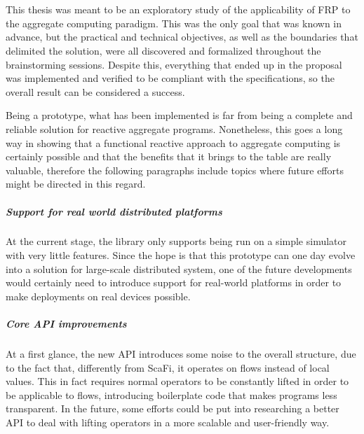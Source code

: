 \chapter{\conclusionsname}
\label{chap:conclusions}

This thesis was meant to be an exploratory study of the applicability of FRP to the aggregate computing paradigm.
%
This was the only goal that was known in advance, but the practical and technical objectives, as well as the boundaries that delimited the solution, were all discovered and formalized throughout the brainstorming sessions.
%
Despite this, everything that ended up in the proposal was implemented and verified to be compliant with the specifications, so the overall result can be considered a success.

Being a prototype, what has been implemented is far from being a complete and reliable solution for reactive aggregate programs.
%
Nonetheless, this goes a long way in showing that a functional reactive approach to aggregate computing is certainly possible and that the benefits that it brings to the table are really valuable, therefore the following paragraphs include topics where future efforts might be directed in this regard.

\paragraph{Support for real world distributed platforms}

At the current stage, the library only supports being run on a simple simulator with very little features.
%
Since the hope is that this prototype can one day evolve into a solution for large-scale distributed system, one of the future developments would certainly need to introduce support for real-world platforms in order to make deployments on real devices possible.

\paragraph{Core API improvements}

At a first glance, the new API introduces some noise to the overall structure, due to the fact that, differently from ScaFi, it operates on flows instead of local values.
%
This in fact requires normal operators to be constantly lifted in order to be applicable to flows, introducing boilerplate code that makes programs less transparent.
%
In the future, some efforts could be put into researching a better API to deal with lifting operators in a more scalable and user-friendly way.

